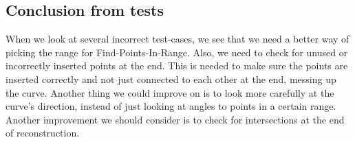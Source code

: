         \subsection{Conclusion from tests}
        When we look at several incorrect test-cases, we see that we need a better way of picking the range for Find-Points-In-Range. Also, we need to check for unused or incorrectly inserted points at the end. This is needed to make sure the points are inserted correctly and not just connected to each other at the end, messing up the curve. Another thing we could improve on is to look more carefully at the curve's direction, instead of just looking at angles to points in a certain range. Another improvement we should consider is to check for intersections at the end of reconstruction. 